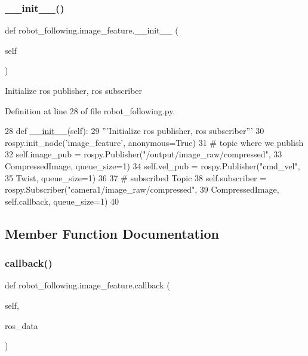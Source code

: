 \subsubsection{\texorpdfstring{\+\_\+\+\_\+init\+\_\+\+\_\+()}{\_\_init\_\_()}}
{\footnotesize\ttfamily def robot\+\_\+following.\+image\+\_\+feature.\+\_\+\+\_\+init\+\_\+\+\_\+ (\begin{DoxyParamCaption}\item[{}]{self }\end{DoxyParamCaption})}

\begin{DoxyVerb}Initialize ros publisher, ros subscriber\end{DoxyVerb}
 

Definition at line 28 of file robot\+\_\+following.\+py.


\begin{DoxyCode}
28     \textcolor{keyword}{def }\hyperlink{classstate__machine_1_1Play_a5993a23d8be7f7b2647f71ede0334957}{\_\_init\_\_}(self):
29         \textcolor{stringliteral}{'''Initialize ros publisher, ros subscriber'''}
30         rospy.init\_node(\textcolor{stringliteral}{'image\_feature'}, anonymous=\textcolor{keyword}{True})
31      \textcolor{comment}{# topic where we publish}
32         self.image\_pub = rospy.Publisher(\textcolor{stringliteral}{"/output/image\_raw/compressed"},
33                                          CompressedImage, queue\_size=1)
34         self.vel\_pub = rospy.Publisher(\textcolor{stringliteral}{"cmd\_vel"},
35                                        Twist, queue\_size=1)
36 
37         \textcolor{comment}{# subscribed Topic}
38         self.subscriber = rospy.Subscriber(\textcolor{stringliteral}{"camera1/image\_raw/compressed"},
39                                            CompressedImage, self.callback,  queue\_size=1)
40 
\end{DoxyCode}


\subsection{Member Function Documentation}
\mbox{\label{classrobot__following_1_1image__feature_af3eddd8a93175ab03651d9ea0352ab56}} 
\subsubsection{\texorpdfstring{callback()}{callback()}}
{\footnotesize\ttfamily def robot\+\_\+following.\+image\+\_\+feature.\+callback (\begin{DoxyParamCaption}\item[{}]{self,  }\item[{}]{ros\+\_\+data }\end{DoxyParamCaption})}

